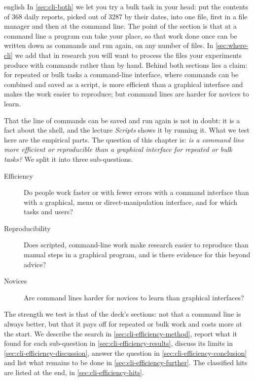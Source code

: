 \begin{onlyin}{english} %
In \cref{sec:cli-both} we let you try a bulk task in your head: put the
contents of 368 daily reports, picked out of 3287 by their dates, into
one file, first in a file manager and then at the command line.  The
point of the section is that at a command line a program can take your
place, so that work done once can be written down as commands and run
again, on any number of files.  In \cref{sec:where-cli} we add that in
research you will want to process the files your experiments produce
with commands rather than by hand.  Behind both sections lies a claim:
for repeated or bulk tasks a
command-line interface, where commands can be combined and saved as a
script, is more efficient than a graphical interface and makes the work
easier to reproduce; but command lines are harder for novices to learn.

That the line of commands can be saved and run again is not in doubt:
it is a fact about the shell, and the lecture \emph{Scripts} shows it
by running it.  What we test here are the empirical parts.  The
question of this chapter is: \emph{is a command line more efficient or
reproducible than a graphical interface for repeated or bulk tasks?}
We split it into three sub-questions.
\begin{description}
  \item[Efficiency] Do people work faster or with fewer errors with a
    command interface than with a graphical, menu or
    direct-manipulation interface, and for which tasks and users?
  \item[Reproducibility] Does scripted, command-line work make
    research easier to reproduce than manual steps in a graphical
    program, and is there evidence for this beyond advice?
  \item[Novices] Are command lines harder for novices to learn than
    graphical interfaces?
\end{description}
The strength we test is that of the deck's sections: not that a
command line is always better, but that it pays off for repeated or
bulk work and costs more at the start.  We describe the search in
\cref{sec:cli-efficiency-method}, report what it found for each
sub-question in \cref{sec:cli-efficiency-results}, discuss its limits
in \cref{sec:cli-efficiency-discussion}, answer the question in
\cref{sec:cli-efficiency-conclusion} and list what remains to be done
in \cref{sec:cli-efficiency-further}.  The classified hits are listed
at the end, in \cref{sec:cli-efficiency-hits}.
\end{onlyin}
